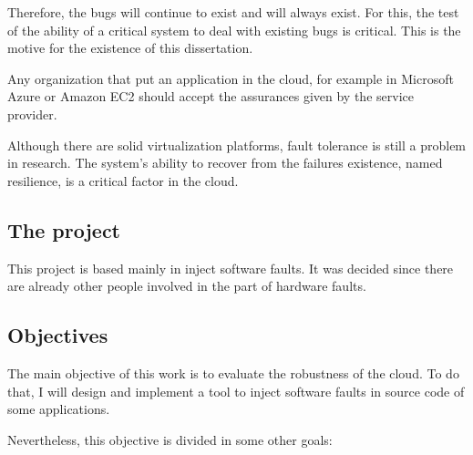 Therefore, the bugs will continue to exist and will always exist. For this, the test of the ability of a critical system to deal with existing bugs is critical. This is the motive for the existence of this dissertation.

Any organization that put an application in the cloud, for example in Microsoft Azure or Amazon EC2 should accept the assurances given by the service provider.



Although there are solid virtualization platforms, fault tolerance is still a problem in research. The system's ability to recover from the failures existence, named resilience, is a critical factor in the cloud.



\subsection{The project}

This project is based mainly in inject software faults. It was decided since there are already other people involved in the part of hardware faults.

\subsection{Objectives}

The main objective of this work is to evaluate the robustness of the cloud. To do that, I will design and implement a tool to inject software faults in source code of some applications.

Nevertheless, this objective is divided in some other goals:



